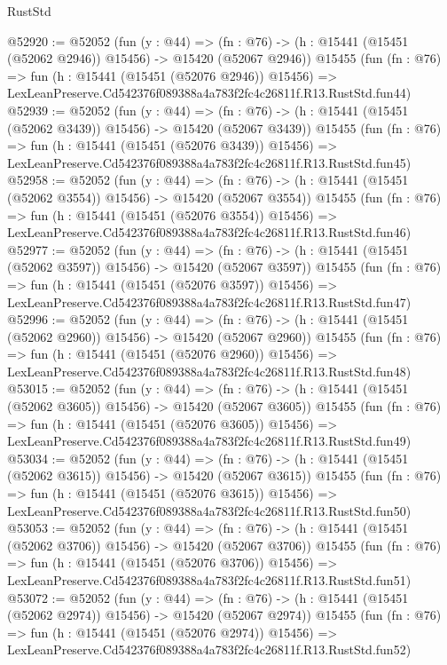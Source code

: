 \begin{lexlean}{RustStd}
\begin{coremodule}
@52920 := @52052
    (fun (y : @44) =>
    (fn : @76) -> (h : @15441 (@15451 (@52062 @2946)) @15456) -> @15420 (@52067 @2946))
    @15455
    (fun (fn : @76) =>
    fun (h : @15441 (@15451 (@52076 @2946)) @15456) =>
    LexLeanPreserve.Cd542376f089388a4a783f2fc4c26811f.R13.RustStd.fun44)
@52939 := @52052
    (fun (y : @44) =>
    (fn : @76) -> (h : @15441 (@15451 (@52062 @3439)) @15456) -> @15420 (@52067 @3439))
    @15455
    (fun (fn : @76) =>
    fun (h : @15441 (@15451 (@52076 @3439)) @15456) =>
    LexLeanPreserve.Cd542376f089388a4a783f2fc4c26811f.R13.RustStd.fun45)
@52958 := @52052
    (fun (y : @44) =>
    (fn : @76) -> (h : @15441 (@15451 (@52062 @3554)) @15456) -> @15420 (@52067 @3554))
    @15455
    (fun (fn : @76) =>
    fun (h : @15441 (@15451 (@52076 @3554)) @15456) =>
    LexLeanPreserve.Cd542376f089388a4a783f2fc4c26811f.R13.RustStd.fun46)
@52977 := @52052
    (fun (y : @44) =>
    (fn : @76) -> (h : @15441 (@15451 (@52062 @3597)) @15456) -> @15420 (@52067 @3597))
    @15455
    (fun (fn : @76) =>
    fun (h : @15441 (@15451 (@52076 @3597)) @15456) =>
    LexLeanPreserve.Cd542376f089388a4a783f2fc4c26811f.R13.RustStd.fun47)
@52996 := @52052
    (fun (y : @44) =>
    (fn : @76) -> (h : @15441 (@15451 (@52062 @2960)) @15456) -> @15420 (@52067 @2960))
    @15455
    (fun (fn : @76) =>
    fun (h : @15441 (@15451 (@52076 @2960)) @15456) =>
    LexLeanPreserve.Cd542376f089388a4a783f2fc4c26811f.R13.RustStd.fun48)
@53015 := @52052
    (fun (y : @44) =>
    (fn : @76) -> (h : @15441 (@15451 (@52062 @3605)) @15456) -> @15420 (@52067 @3605))
    @15455
    (fun (fn : @76) =>
    fun (h : @15441 (@15451 (@52076 @3605)) @15456) =>
    LexLeanPreserve.Cd542376f089388a4a783f2fc4c26811f.R13.RustStd.fun49)
@53034 := @52052
    (fun (y : @44) =>
    (fn : @76) -> (h : @15441 (@15451 (@52062 @3615)) @15456) -> @15420 (@52067 @3615))
    @15455
    (fun (fn : @76) =>
    fun (h : @15441 (@15451 (@52076 @3615)) @15456) =>
    LexLeanPreserve.Cd542376f089388a4a783f2fc4c26811f.R13.RustStd.fun50)
@53053 := @52052
    (fun (y : @44) =>
    (fn : @76) -> (h : @15441 (@15451 (@52062 @3706)) @15456) -> @15420 (@52067 @3706))
    @15455
    (fun (fn : @76) =>
    fun (h : @15441 (@15451 (@52076 @3706)) @15456) =>
    LexLeanPreserve.Cd542376f089388a4a783f2fc4c26811f.R13.RustStd.fun51)
@53072 := @52052
    (fun (y : @44) =>
    (fn : @76) -> (h : @15441 (@15451 (@52062 @2974)) @15456) -> @15420 (@52067 @2974))
    @15455
    (fun (fn : @76) =>
    fun (h : @15441 (@15451 (@52076 @2974)) @15456) =>
    LexLeanPreserve.Cd542376f089388a4a783f2fc4c26811f.R13.RustStd.fun52)

\end{coremodule}
\end{lexlean}
